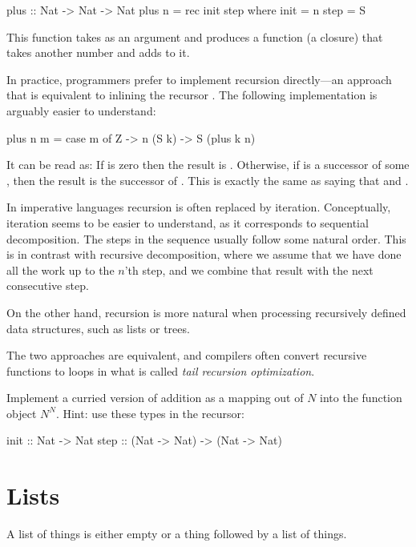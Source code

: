 \documentclass[DaoFP]{subfiles}
\begin{document}
\begin{haskell}
plus :: Nat -> Nat -> Nat
plus n = rec init step
  where
    init = n
    step = S
\end{haskell}
This function takes  as an argument and produces a function (a closure) that takes another number and adds   to it. 

In practice, programmers prefer to implement recursion directly---an approach that is equivalent to inlining the recursor . The following implementation is arguably easier to understand:
\begin{haskell}
plus n m = case m of
  Z -> n
  (S k) -> S (plus k n)
\end{haskell}
It can be read as: If  is zero then the result is . Otherwise, if  is a successor of some , then the result is the successor of  . This is exactly the same as saying that  and .

In imperative languages recursion is often replaced by iteration. Conceptually, iteration seems to be easier to understand, as it corresponds to sequential decomposition. The steps in the sequence usually follow some natural order. This is in contrast with recursive decomposition, where we assume that we have done all the work up to the $n$'th step, and we combine that result with the next consecutive step. 

On the other hand, recursion is more natural when processing recursively defined data structures, such as lists or trees. 

The two approaches are equivalent, and compilers often convert recursive functions to loops in what is called \emph{tail recursion optimization}.

\begin{exercise}
Implement a curried version of addition as a mapping out of $N$ into the function object $N^N$. Hint: use these types in the recursor:
\begin{haskell}
init :: Nat -> Nat
step :: (Nat -> Nat) -> (Nat -> Nat)
\end{haskell}

\end{exercise}

\section{Lists}

A list of things is either empty or a thing followed by a list of things. 
\end{document}
